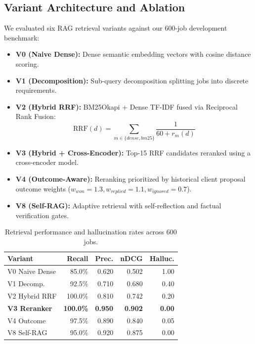 \documentclass[10pt,a4paper,twocolumn]{article}
\begin{document}
\subsection{Variant Architecture and Ablation}
We evaluated six RAG retrieval variants against our 600-job development benchmark:
\begin{itemize}[leftmargin=*,noitemsep]
    \item \textbf{V0 (Naive Dense):} Dense semantic embedding vectors with cosine distance scoring.
    \item \textbf{V1 (Decomposition):} Sub-query decomposition splitting jobs into discrete requirements.
    \item \textbf{V2 (Hybrid RRF):} BM25Okapi + Dense TF-IDF fused via Reciprocal Rank Fusion:
    \begin{equation}
        \text{RRF}(d) = \sum_{m \in \{dense, bm25\}} \frac{1}{60 + r_m(d)}
    \end{equation}
    \item \textbf{V3 (Hybrid + Cross-Encoder):} Top-15 RRF candidates reranked using a cross-encoder model.
    \item \textbf{V4 (Outcome-Aware):} Reranking prioritized by historical client proposal outcome weights ($w_{won} = 1.3, w_{replied} = 1.1, w_{ignored} = 0.7$).
    \item \textbf{V8 (Self-RAG):} Adaptive retrieval with self-reflection and factual verification gates.
\end{itemize}

\begin{table}[htbp]
\centering
\scriptsize
\setlength{\tabcolsep}{3pt}
\caption{Retrieval performance and hallucination rates across 600 jobs.}
\label{tab:rag_eval}
\begin{tabular*}{\linewidth}{@{\extracolsep{\fill}}lrrrr@{}}
\toprule
\textbf{Variant} & \textbf{Recall} & \textbf{Prec.} & \textbf{nDCG} & \textbf{Halluc.} \\
\midrule
V0 Naive Dense       & 85.0\%          & 0.620          & 0.502          & 1.00 \\
V1 Decomp.          & 92.5\%          & 0.710          & 0.680          & 0.40 \\
V2 Hybrid RRF        & 100.0\%         & 0.810          & 0.742          & 0.20 \\
\textbf{V3 Reranker} & \textbf{100.0\%}& \textbf{0.950} & \textbf{0.902} & \textbf{0.00} \\
V4 Outcome           & 97.5\%          & 0.890          & 0.840          & 0.05 \\
V8 Self-RAG          & 95.0\%          & 0.920          & 0.875          & 0.00 \\
\bottomrule
\end{tabular*}
\end{table}
\end{document}
